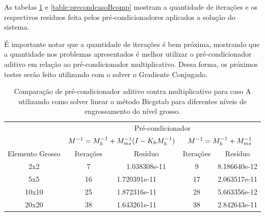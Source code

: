 As tabelas \ref{table:precondcasoAcomp} e \ref{table:precondcasoBcomp} mostram a quantidade de iterações e os respectivos resíduos feita pelos pré-condicionadores aplicados a solução do sistema. 

É importante notar que a quantidade de iterações é bem próxima, mostrando que a quantidade
nos problemas apresentados é melhor utilizar o pré-condicionador aditivo em relação ao pré-condicionador multiplicativo. Dessa forma, os próximos
testes serão feito utilizando com o solver o Gradiente Conjugado.

\begin{table}[]\label{table:precondcasoAcomp}
    \caption{Comparação de pré-condicionador aditivo contra multiplicativo para caso A utilizando como solver linear o método Bicgstab para diferentes níveis de engrossamento do nível grosso.}
    \begin{tabular}{c|c|l|c|l|}

    \cline{2-5}
                                          & \multicolumn{4}{c|}{Pré-condicionador}                                                        \\ \cline{2-5} 
                                          & \multicolumn{2}{c|}{$M^{-1}=M^{-1}_{h} + M^{-1}_{ms}(I-K_hM^{-1}_{h})$}               & \multicolumn{2}{c|}{$M^{-1}=M^{-1}_{h} + M^{-1}_{ms}$}                \\ \hline
    \multicolumn{1}{|c|}{Elemento Grosso} & Iterações & \multicolumn{1}{c|}{Resíduo}      & Iterações & \multicolumn{1}{c|}{Resíduo}      \\ \hline
    \multicolumn{1}{|c|}{2x2}             & 7         & \multicolumn{1}{c|}{1.038308e-11} & 9         & \multicolumn{1}{c|}{8.186640e-12} \\ \hline
    \multicolumn{1}{|c|}{5x5}             & 16        & 1.720391e-11                      & 17        & 2.063517e-11                      \\ \hline
    \multicolumn{1}{|c|}{10x10}           & 25        & 1.872316e-11                      & 28        & 5.663356e-12                      \\ \hline
    \multicolumn{1}{|c|}{20x20}           & 38        & 1.643261e-11                      & 38        & 2.842643e-11                      \\ \hline
    \end{tabular}
\end{table}


